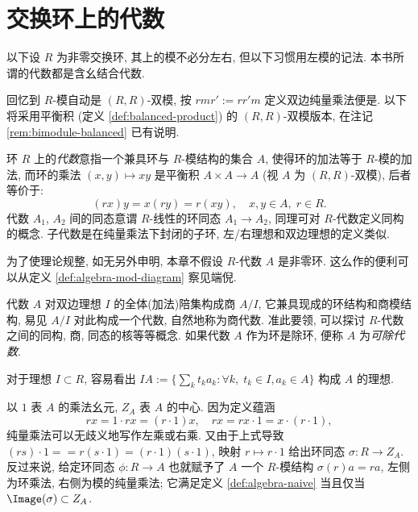 \section{交换环上的代数}\label{sec:algebra-def}
以下设 $R$ 为非零交换环, 其上的模不必分左右, 但以下习惯用左模的记法. 本书所谓的代数都是含幺结合代数.

回忆到 $R$-模自动是 $(R,R)$-双模, 按 $rmr' := rr'm$ 定义双边纯量乘法便是. 以下将采用平衡积 (定义 \ref{def:balanced-product}) 的 $(R,R)$-双模版本, 在注记 \ref{rem:bimodule-balanced} 已有说明.

\begin{definition}\label{def:algebra-naive}
	环 $R$ 上的\emph{代数}意指一个兼具环与 $R$-模结构的集合 $A$, 使得环的加法等于 $R$-模的加法, 而环的乘法 $(x,y) \mapsto xy$ 是平衡积 $A \times A \to A$ (视 $A$ 为 $(R,R)$-双模), 后者等价于:
	\[ (rx)y = x(ry) = r(xy), \quad x,y \in A, \; r \in R. \]
	代数 $A_1$, $A_2$ 间的同态意谓 $R$-线性的环同态 $A_1 \to A_2$, 同理可对 $R$-代数定义同构的概念. 子代数是在纯量乘法下封闭的子环, 左/右理想和双边理想的定义类似.
\end{definition}

\begin{convention}
	为了使理论规整, 如无另外申明, 本章不假设 $R$-代数 $A$ 是非零环. 这么作的便利可以从定义 \ref{def:algebra-mod-diagram} 察见端倪.
\end{convention}

代数 $A$ 对双边理想 $I$ 的全体(加法)陪集构成商 $A/I$, 它兼具现成的环结构和商模结构, 易见 $A/I$ 对此构成一个代数, 自然地称为商代数. 准此要领, 可以探讨 $R$-代数之间的同构, 商, 同态的核等等概念. 如果代数 $A$ 作为环是除环, 便称 $A$ 为\emph{可除代数}. 

对于理想 $I \subset R$, 容易看出 $IA := \{ \sum_k t_k a_k : \forall k, \; t_k \in I, a_k \in A\}$ 构成 $A$ 的理想.

以 $1$ 表 $A$ 的乘法幺元, $Z_A$ 表 $A$ 的中心. 因为定义蕴涵
\[ rx = 1 \cdot rx = (r \cdot 1)x, \quad rx = rx \cdot 1 = x \cdot (r \cdot 1), \]
纯量乘法可以无歧义地写作左乘或右乘. 又由于上式导致 $(rs) \cdot 1 = = r(s \cdot 1) = (r \cdot 1) (s \cdot 1)$, 映射 $r \mapsto r \cdot 1$ 给出环同态 $\sigma: R \to Z_A$. 反过来说, 给定环同态 $\phi: R \to A$ 也就赋予了 $A$ 一个 $R$-模结构 $\sigma(r)a = ra$, 左侧为环乘法, 右侧为模的纯量乘法; 它满足定义 \ref{def:algebra-naive} 当且仅当 $\Image(\sigma) \subset Z_A$.

